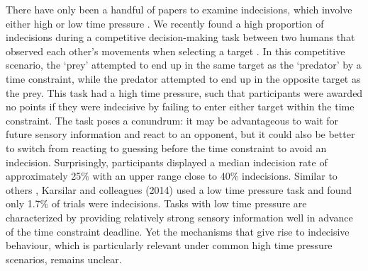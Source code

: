 \documentclass[12pt]{article}
\begin{document}
There have only been a handful of papers to examine indecisions, which involve either high \autocite{lokeshHumansUtilizeSensory2022} or low time pressure \autocite{karsilarSpeedAccuracyTradeoff2014, wuCapacityCognitiveControl2016,philiastidesCausalRoleDorsolateral2011, dambacherTimePressureAffects2015,forstmannStriatumPreSMAFacilitate2008}. We recently found a high proportion of indecisions during a competitive decision-making task between two humans that observed each other’s movements when selecting a target \autocite{lokeshHumansUtilizeSensory2022}. In this competitive scenario, the ‘prey’ attempted to end up in the same target as the ‘predator’ by a time constraint, while the predator attempted to end up in the opposite target as the prey. This task had a high time pressure, such that participants were awarded no points if they were indecisive by failing to enter either target within the time constraint. The task poses a conundrum: it may be advantageous to wait for future sensory information and react to an opponent, but it could also be better to switch from reacting to guessing before the time constraint to avoid an indecision. Surprisingly, participants displayed a median indecision rate of approximately 25\% with an upper range close to 40\% indecisions. Similar to others \autocite{karsilarSpeedAccuracyTradeoff2014, wuCapacityCognitiveControl2016, philiastidesCausalRoleDorsolateral2011, dambacherTimePressureAffects2015,forstmannStriatumPreSMAFacilitate2008}, Karsilar and colleagues (2014) used a low time pressure task and found only 1.7\% of trials were indecisions. Tasks with low time pressure are characterized by providing relatively strong sensory information well in advance of the time constraint deadline. Yet the mechanisms that give rise to indecisive behaviour, which is particularly relevant under common high time pressure scenarios, remains unclear. 
\end{document}
